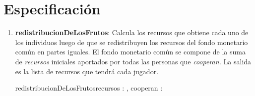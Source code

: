 \documentclass[10pt,a4paper]{article}
\begin{document}

\newpage

\section{Especificación}

\begin{enumerate}
    \item \textbf{redistribucionDeLosFrutos}: Calcula los recursos que obtiene cada uno de los individuos luego de que se redistribuyen los recursos del fondo monetario común en partes iguales. El fondo monetario común se compone de la suma de \textit{recursos} iniciales aportados por todas las personas que \textit{cooperan.} La salida es la lista de recursos que tendrá cada jugador.

\vspace{16pt}

\begin{proc}{redistribucionDeLosFrutos}{\In recursos : \TLista{\float}, \In cooperan : \TLista{\bool}}{\TLista{\float}}{
	
        
        }
\end{proc}
\vspace{8pt}


\vspace{32pt}


\end{enumerate}
\end{document}

